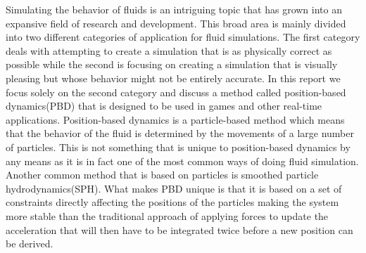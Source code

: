 Simulating the behavior of fluids is an intriguing topic that has grown into an
expansive field of research and development. This broad area is mainly divided
into two different categories of application for fluid simulations. The first
category deals with attempting to create a simulation that is as physically
correct as possible while the second is focusing on creating a simulation that
is visually pleasing but whose behavior might not be entirely accurate. In this
report we focus solely on the second category and discuss a method called
position-based dynamics(PBD)\cite{muller2007position} that is designed to be
used in games and other real-time applications. Position-based dynamics is a
particle-based method which means that the behavior of the fluid is determined
by the movements of a large number of particles. This is not something that is
unique to position-based dynamics by any means as it is in fact one of the most
common ways of doing fluid simulation. Another common method that is based on
particles is smoothed particle hydrodynamics(SPH)\cite{monaghan1992smoothed}.
What makes PBD unique is that it is based on a set of constraints directly
affecting the positions of the particles making the system more stable than the
traditional approach of applying forces to update the acceleration that will
then have to be integrated twice before a new position can be derived.
